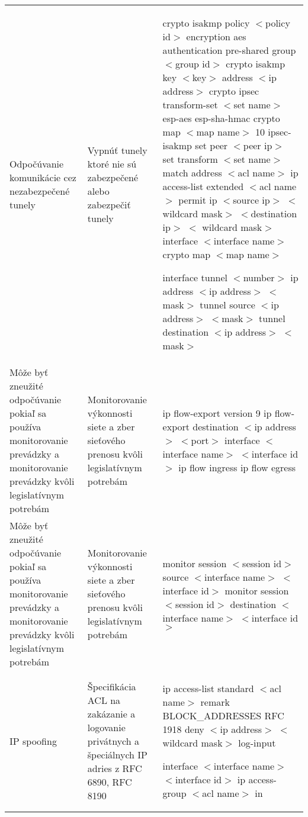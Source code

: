 \begin{longtable}[!htbp]{|L{10em}L{10em}L{34em}|}
	
	
	
	 Odpočúvanie komunikácie  cez nezabezpečené tunely	&Vypnúť tunely ktoré nie sú zabezpečené alebo zabezpečiť tunely	&crypto isakmp policy $<$policy id$>$
	encryption aes
	authentication pre-shared
	group $<$group id$>$
	crypto isakmp key $<$key$>$ address $<$ip address$>$ 
	crypto ipsec transform-set $<$set name$>$ esp-aes esp-sha-hmac
	crypto map $<$map name$>$ 10 ipsec-isakmp
	set peer $<$peer ip$>$
	set transform $<$set name$>$ 
	match address $<$acl name$>$
	ip access-list extended $<$acl name$>$
	permit ip $<$source ip$>$ $<$wildcard mask$>$ $<$destination ip$>$ $<$ wildcard mask$>$
	interface $<$interface name$>$
	crypto map $<$map name$>$
	
	interface tunnel $<$number$>$
	ip address $<$ip address$>$ $<$mask$>$
	tunnel source $<$ip address$>$ $<$mask$>$
	tunnel destination $<$ip address$>$ $<$mask$>$\\
	
	
	
	
	Môže byť zneužité odpočúvanie pokiaľ sa používa monitorovanie prevádzky a monitorovanie prevádzky kvôli legislatívnym potrebám	&Monitorovanie výkonnosti siete a zber sieťového prenosu kvôli legislatívnym potrebám	&ip flow-export version 9
	ip flow-export destination $<$ip address$>$ $<$port$>$
	interface $<$interface name$>$ $<$interface id$>$
	ip flow ingress
	ip flow egress\\
	
	
	
	
	 Môže byť zneužité odpočúvanie pokiaľ sa používa monitorovanie prevádzky a monitorovanie prevádzky kvôli legislatívnym potrebám	&Monitorovanie výkonnosti siete a zber sieťového prenosu kvôli legislatívnym potrebám	&monitor session $<$session id$>$ source $<$interface name$>$ $<$interface id$>$ 
	monitor session $<$session id$>$ destination $<$interface name$>$ $<$interface id$>$\\
	
	
	
	
	IP spoofing	&Špecifikácia ACL na zakázanie a logovanie privátnych a špeciálnych IP adries z RFC 6890, RFC 8190	&ip access-list standard $<$acl name$>$
	remark BLOCK\_ADDRESSES RFC 1918
	deny $<$ip address$>$ $<$wildcard mask$>$ log-input
	
	interface $<$interface name$>$ $<$interface id$>$
	ip access-group $<$acl name$>$ in\\
	
	
	

\end{longtable}
